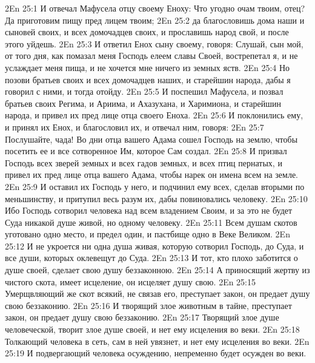 \vs 2En 25:1
И отвечал Мафусела отцу своему Еноху: Что угодно очам твоим, отец? Да приготовим пищу пред лицем твоим;
\vs 2En 25:2
да благословишь дома наши и сыновей своих, и всех домочадцев своих, и прославишь народ свой, и после этого уйдешь.
\vs 2En 25:3
И ответил Енох сыну своему, говоря: Слушай, сын мой, от того дня, как помазал меня Господь елеем славы Своей, вострепетал я, и не услаждает меня пища, и не хочется мне ничего из земных яств.
\vs 2En 25:4
Но позови братьев своих и всех домочадцев наших, и старейшин народа, дабы я говорил с ними, и тогда отойду.
\vs 2En 25:5
И поспешил Мафусела, и позвал братьев своих Регима, и Ариима, и Ахазухана, и Харимиона, и старейшин народа, и привел их пред лице отца своего Еноха.
\vs 2En 25:6
И поклонились ему, и принял их Енох, и благословил их, и отвечал ним, говоря:
\vs 2En 25:7
Послушайте, чада! Во дни отца вашего Адама сошел Господь на землю, чтобы посетить ее и все сотворенное Им, которое Сам создал.
\vs 2En 25:8
И призвал Господь всех зверей земных и всех гадов земных, и всех птиц пернатых, и привел их пред лице отца вашего Адама, чтобы нарек он имена всем на земле.
\vs 2En 25:9
И оставил их Господь у него, и подчинил ему всех, сделав вторыми по меньшинству, и притупил весь разум их, дабы повиновались человеку.
\vs 2En 25:10
Ибо Господь сотворил человека над всем владением Своим, и за это не будет Суда никакой душе живой, но одному человеку.
\vs 2En 25:11
Всем душам скотов уготовано одно место, и предел один, и пастбище одно в Веке Великом.
\vs 2En 25:12
И не укроется ни одна душа живая, которую сотворил Господь, до Суда, и все души, которых оклевещут до Суда.
\vs 2En 25:13
И тот, кто плохо заботится о душе своей, сделает свою душу беззаконною.
\vs 2En 25:14
А приносящий жертву из чистого скота, имеет исцеление, он исцеляет душу свою.
\vs 2En 25:15
Умерщвляющий же скот всякий, не связав его, преступает закон, он предает душу свою беззаконию.
\vs 2En 25:16
И творящий злое животным в тайне, преступает закон, он предает душу свою беззаконию.
\vs 2En 25:17
Творящий злое душе человеческой, творит злое душе своей, и нет ему исцеления во веки.
\vs 2En 25:18
Толкающий человека в сеть, сам в ней увязнет, и нет ему исцеления во веки.
\vs 2En 25:19
И подвергающий человека осуждению, непременно будет осужден во веки.

